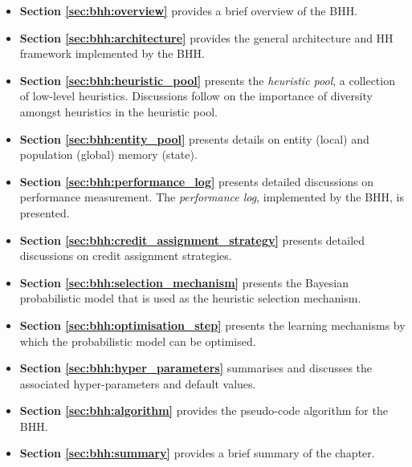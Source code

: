 \begin{itemize}
      \item \textbf{Section \ref{sec:bhh:overview}} provides a brief overview of the \Acs{BHH}.

      \item \textbf{Section \ref{sec:bhh:architecture}} provides the general architecture and \Ac{HH} framework implemented by the \Acs{BHH}.

      \item \textbf{Section \ref{sec:bhh:heuristic_pool}} presents the \textit{heuristic pool}, a collection of low-level heuristics. Discussions follow on the importance of diversity amongst heuristics in the heuristic pool.

      \item \textbf{Section \ref{sec:bhh:entity_pool}} presents details on entity (local) and population (global) memory (state).

      \item \textbf{Section \ref{sec:bhh:performance_log}} presents detailed discussions on performance measurement. The \textit{performance log}, implemented by the \acs{BHH}, is presented.

      \item \textbf{Section \ref{sec:bhh:credit_assignment_strategy}} presents detailed discussions on credit assignment strategies.

      \item \textbf{Section \ref{sec:bhh:selection_mechanism}} presents the Bayesian probabilistic model that is used as the heuristic selection mechanism.

      \item \textbf{Section \ref{sec:bhh:optimisation_step}} presents the learning mechanisms by which the probabilistic model can be optimised.

      \item \textbf{Section \ref{sec:bhh:hyper_parameters}} summarises and discusses the associated hyper-parameters and default values.

      \item \textbf{Section \ref{sec:bhh:algorithm}} provides the pseudo-code algorithm for the \acs{BHH}.

      \item \textbf{Section \ref{sec:bhh:summary}} provides a brief summary of the chapter.
\end{itemize}


